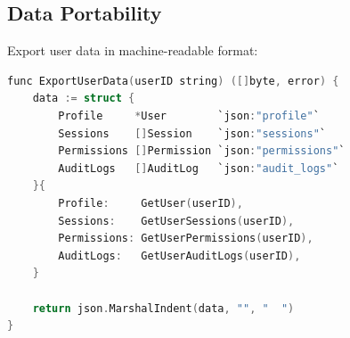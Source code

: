 \subsection{Data Portability}

Export user data in machine-readable format:

\begin{lstlisting}[language=C]
func ExportUserData(userID string) ([]byte, error) {
    data := struct {
        Profile     *User        `json:"profile"`
        Sessions    []Session    `json:"sessions"`
        Permissions []Permission `json:"permissions"`
        AuditLogs   []AuditLog   `json:"audit_logs"`
    }{
        Profile:     GetUser(userID),
        Sessions:    GetUserSessions(userID),
        Permissions: GetUserPermissions(userID),
        AuditLogs:   GetUserAuditLogs(userID),
    }

    return json.MarshalIndent(data, "", "  ")
}
\end{lstlisting}

